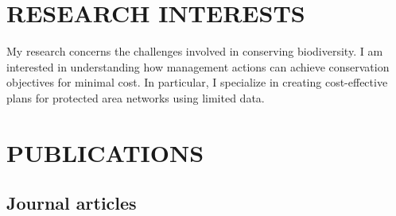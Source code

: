 \documentclass[12pt,a4paper]{article}
\begin{document}
\section*{RESEARCH INTERESTS}

My research concerns the challenges involved in conserving biodiversity. I am interested in understanding how management actions can achieve conservation objectives for minimal cost. In particular, I specialize in creating cost-effective plans for protected area networks using limited data.

\clearpage

\section*{PUBLICATIONS}
\subsection*{Journal articles}
\end{document}
